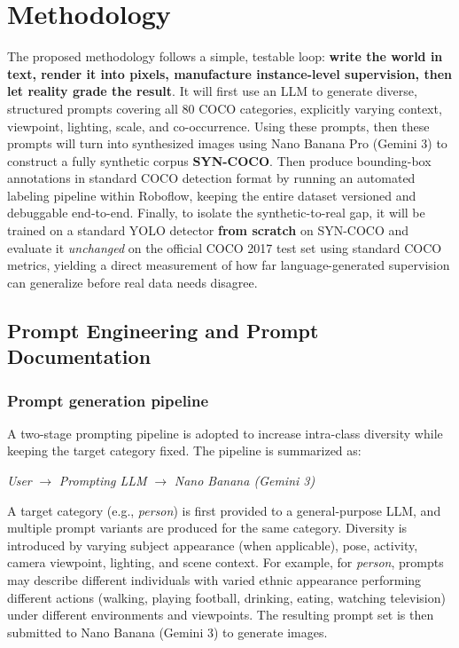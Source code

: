 \documentclass[conference]{IEEEtran}
\begin{document}
\section{Methodology}
\label{sec:method}
The proposed methodology follows a simple, testable loop: \textbf{write the world in text, render it into pixels, manufacture instance-level supervision, then let reality grade the result}. It will first use an LLM to generate diverse, structured prompts covering all 80 COCO categories, explicitly varying context, viewpoint, lighting, scale, and co-occurrence. Using these prompts, then these prompts will turn into synthesized images using Nano Banana Pro (Gemini 3) to construct a fully synthetic corpus \textbf{SYN-COCO}. Then produce bounding-box annotations in standard COCO detection format by running an automated labeling pipeline within Roboflow, keeping the entire dataset versioned and debuggable end-to-end. Finally, to isolate the synthetic-to-real gap, it will be trained on a standard YOLO detector \textbf{from scratch} on SYN-COCO and evaluate it \emph{unchanged} on the official COCO 2017 test set using standard COCO metrics, yielding a direct measurement of how far language-generated supervision can generalize before real data needs disagree.


\subsection{Prompt Engineering and Prompt Documentation}
\label{subsec:prompting}

\subsubsection{Prompt generation pipeline}
A two-stage prompting pipeline is adopted to increase intra-class diversity while keeping the target category fixed. The pipeline is summarized as:
\begin{center}
\textit{User} $\rightarrow$ \textit{Prompting LLM} $\rightarrow$ \textit{Nano Banana (Gemini 3)}
\end{center}
A target category (e.g., \textit{person}) is first provided to a general-purpose LLM, and multiple prompt variants are produced for the same category. Diversity is introduced by varying subject appearance (when applicable), pose, activity, camera viewpoint, lighting, and scene context. For example, for \textit{person}, prompts may describe different individuals with varied ethnic appearance performing different actions (walking, playing football, drinking, eating, watching television) under different environments and viewpoints. The resulting prompt set is then submitted to Nano Banana (Gemini 3) to generate images.
\end{document}
